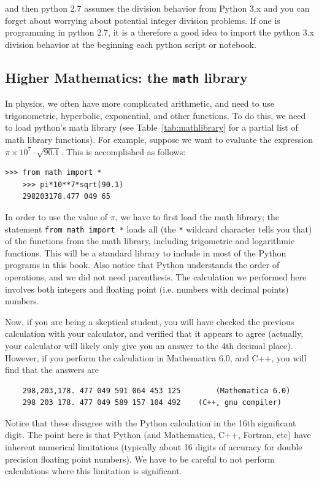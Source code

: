 and then python 2.7 assumes the division behavior from Python 3.x and you can forget about worrying about potential integer division problems. If one is programming in python 2.7, it is a therefore a good idea to import the python 3.x division behavior at the beginning each python script or notebook.


\subsection{Higher Mathematics: the \texttt{math} library}
\label{sec:mathLibrary}
In physics, we often have more complicated arithmetic, and need to use trigonometric, hyperbolic, exponential, and other functions. To do this, we need to load python's math library (see Table~\ref{tab:mathlibrary} for a partial list of math library functions). For example, suppose we want to evaluate the expression $\pi\times 10^{7} \cdot \sqrt{90.1}$. This is accomplished as follows: 
\begin{lstlisting}[style = pythonSnippet]
	>>> from math import *
	>>> pi*10**7*sqrt(90.1)
	298203178.477 049 65
\end{lstlisting}
In order to use the value of $\pi$, we have to first load the math library; the statement \texttt{from math import *} loads all (the \verb!*! wildcard character tells you that) of the functions from the math library, including trigometric and logarithmic functions. This will be a standard library to include in most of the Python programs in this book. 
Also notice that Python understands the order of operations, and we did not need parenthesis. The calculation we performed here involves both integers and floating point (i.e. numbers with decimal points) numbers. 

Now, if you are being a skeptical student, you will have checked the previous calculation with your calculator, and verified that it appears to agree (actually, your calculator will likely only give you an answer to the 4th decimal place). However, if you perform the calculation in Mathematica 6.0, and C++, you will find that the answers are 
\small\begin{verbatim}
	298,203,178. 477 049 591 064 453 125		(Mathematica 6.0)
	298 203 178. 477 049 589 157 104 492 	(C++, gnu compiler)	
\end{verbatim}\normalsize
Notice that these disagree with the Python calculation in the 16th significant digit. The point here is that Python (and Mathematica, C++, Fortran, etc) have inherent numerical limitations (typically about 16 digits of accuracy for double precision floating point numbers). We have to be careful to not perform calculations where this limitation is significant.


